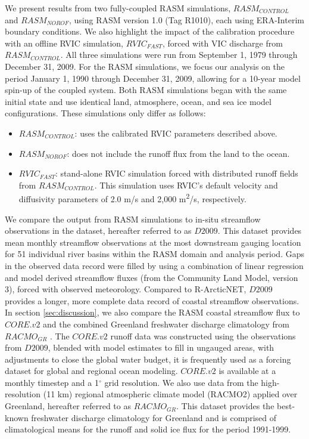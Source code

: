 \documentclass[jgrga, draft]{agutex}
\begin{document}
\begin{article}
We present results from two fully-coupled RASM simulations, $RASM_{CONTROL}$ and $RASM_{NOROF}$, using RASM version 1.0 (Tag R1010), each using ERA-Interim boundary conditions.
We also highlight the impact of the calibration procedure with an offline RVIC simulation, $RVIC_{FAST}$, forced with VIC discharge from $RASM_{CONTROL}$.
All three simulations were run from September 1, 1979 through December 31, 2009.
For the RASM simulations, we focus our analysis on the period January 1, 1990 through December 31, 2009, allowing for a 10-year model spin-up of the coupled system.
Both RASM simulations began with the same initial state \citep[see ][]{Hamman_2016} and use identical land, atmosphere, ocean, and sea ice model configurations.
These simulations only differ as follows:
\begin{itemize}[leftmargin=+.5in]
  \item $RASM_{CONTROL}$: uses the calibrated RVIC parameters described above.
  \item $RASM_{NOROF}$: does not include the runoff flux from the land to the ocean.
  \item $RVIC_{FAST}$: stand-alone RVIC simulation forced with distributed runoff fields from $RASM_{CONTROL}$. This simulation uses RVIC's default velocity and diffusivity parameters of 2.0 m/s and 2,000 m\textsuperscript{2}/s, respectively.
\end{itemize}

We compare the output from RASM simulations to in-situ streamflow observations in the \citet{Dai_2009} dataset, hereafter referred to as $D2009$.
This dataset provides mean monthly streamflow observations at the most downstream gauging location for 51 individual river basins within the RASM domain and analysis period.
Gaps in the observed data record were filled by \citet{Dai_2009} using a combination of linear regression and model derived streamflow fluxes (from the Community Land Model, version 3), forced with observed meteorology.
Compared to R-ArcticNET, $D2009$ provides a longer, more complete data record of coastal streamflow observations.
In section \ref{sec:discussion}, we also compare the RASM coastal streamflow flux to $CORE.v2$ \citep{Large_2009} and the combined Greenland freshwater discharge climatology from $RACMO_{GR}$ \citep[e.g.][]{Bougamont_2005,Bougamont_2007,Rignot_2006}.
The $CORE.v2$ runoff data was constructed using the observations from $D2009$, blended with model estimates to fill in ungauged areas, with adjustments to close the global water budget, it is frequently used as a forcing dataset for global and regional ocean modeling.
$CORE.v2$ is available at a monthly timestep and a 1$^{\circ}$ grid resolution.
We also use data from the high-resolution (11 km) regional atmospheric climate model (RACMO2) applied over Greenland, hereafter referred to as $RACMO_{GR}$.
This dataset provides the best-known freshwater discharge climatology for Greenland and is comprised of climatological means for the runoff and solid ice flux for the period 1991-1999.


\end{article}
\end{document}
